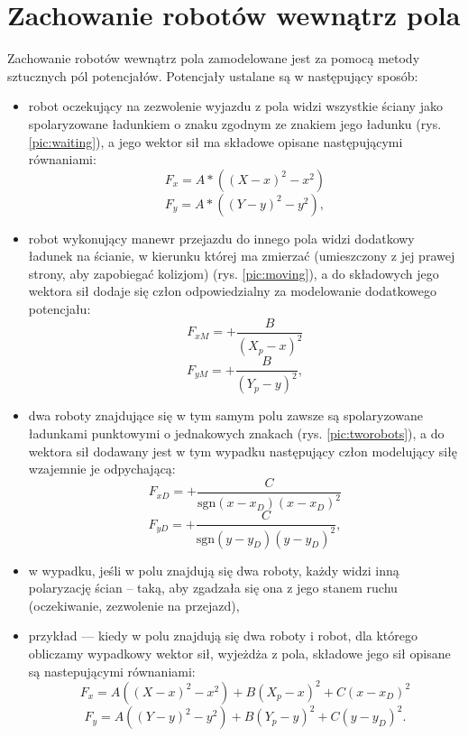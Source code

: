 \section{Zachowanie robotów wewnątrz pola}
	Zachowanie robotów wewnątrz pola zamodelowane jest za pomocą metody sztucznych pól potencjałów. Potencjały ustalane są w następujący sposób:
	\begin{itemize}
		\item robot oczekujący na zezwolenie wyjazdu z pola widzi wszystkie ściany jako spolaryzowane ładunkiem o znaku zgodnym ze znakiem jego ładunku (rys. \ref{pic:waiting}), a jego wektor sił ma składowe opisane następującymi równaniami:
                  $$F_x= A*((X-x)^2 - x^2)$$
		  $$F_y= A*((Y-y)^2 - y^2),$$
		\item robot wykonujący manewr przejazdu do innego pola widzi dodatkowy ładunek na ścianie, w kierunku której ma zmierzać (umieszczony z jej prawej strony, aby zapobiegać kolizjom) (rys. \ref{pic:moving}), a do składowych jego wektora sił dodaje się człon odpowiedzialny za modelowanie dodatkowego potencjału:
                  $$F_{xM}= +\frac{B}{(X_p-x)^2}$$
                  $$F_{yM}= +\frac{B}{(Y_p-y)^2},$$
		\item dwa roboty znajdujące się w tym samym polu zawsze są spolaryzowane ładunkami punktowymi o jednakowych znakach (rys. \ref{pic:tworobots}), a do wektora sił dodawany jest w tym wypadku następujący człon modelujący siłę wzajemnie je odpychającą:
                  $$F_{xD}= +\frac{C}{\mathrm{sgn}(x-x_D)(x-x_D)^2}$$
                  $$F_{yD}= +\frac{C}{\mathrm{sgn}(y-y_D)(y-y_D)^2},$$ 
		\item w wypadku, jeśli w polu znajdują się dwa roboty, każdy widzi inną polaryzację ścian -- taką, aby zgadzała się ona z jego stanem ruchu (oczekiwanie, zezwolenie na przejazd),
                \item przykład --- kiedy w polu znajdują się dwa roboty i robot, dla którego obliczamy wypadkowy wektor sił, wyjeżdża z pola, składowe jego sił opisane są nastepującymi równaniami:
                  $$F_x= A((X-x)^2 - x^2)+B(X_p-x)^2+C(x-x_D)^2$$
                  $$F_y= A((Y-y)^2 - y^2)+B(Y_p-y)^2+C(y-y_D)^2.$$ 
	\end{itemize}
	
